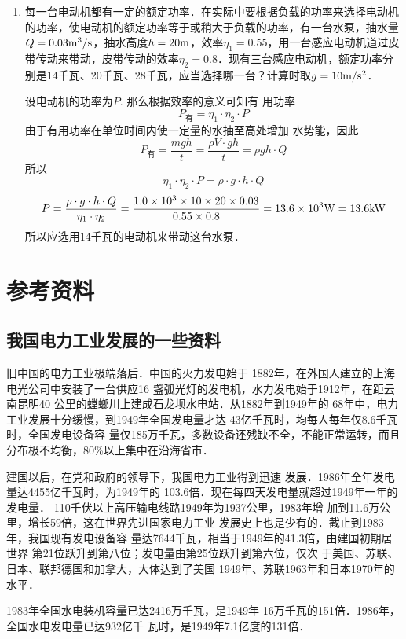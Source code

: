\begin{enumerate}
    \item 每一台电动机都有一定的额定功率．在实际中要根据负载的功率来选择电动机的功率，使电动机的额定功率等于或稍大于负载的功率，有一台水泵，抽水量$Q=0.03{\rm m^3}/{\rm s}$，抽水高度$h=20{\rm m}$，效率$\eta_1=0.55$，用一台感应电动机道过皮带传动来带动，皮带传动的效率$\eta_2=0.8$．现有三台感应电动机，额定功率分别是14千瓦、20千瓦、28千瓦，应当选择哪一台？计算时取$g=10\text{m}/\text{s}^2$．

    \begin{solution}
设电动机的功率为$P$. 那么根据效率的意义可知有
用功率
\[P_{\text{有}}=\eta_1\cdot \eta_2\cdot P\]
由于有用功率在单位时间内使一定量的水抽至高处增加
水势能，因此
\[P_{\text{有}}=\frac{mgh}{t}=\frac{\rho V\cdot gh}{t}=\rho gh\cdot Q\]
所以
\[\eta_1\cdot \eta_2\cdot Ρ=\rho \cdot g\cdot h\cdot Q\]
\[P=\frac{\rho \cdot g\cdot h\cdot Q}{\eta_1\cdot \eta_2}=\frac{1.0\times 10^3\times 10\times 20\times 0.03}{0.55\times 0.8}=13.6\times 10^3{\rm W}=13.6{\rm kW}\]
所以应选用14千瓦的电动机来带动这台水泵．
    \end{solution}    
\end{enumerate}



\section{参考资料}
\subsection{我国电力工业发展的一些资料}

旧中国的电力工业极端落后．中国的火力发电始于
1882年，在外国人建立的上海电光公司中安装了一台供应16
盏弧光灯的发电机，水力发电始于1912年，在距云南昆明40
公里的螳螂川上建成石龙坝水电站．从1882年到1949年的
68年中，电力工业发展十分缓慢，到1949年全国发电量才达
43亿千瓦时，均每人每年仅8.6千瓦时，全国发电设备容
量仅185万千瓦，多数设备还残缺不全，不能正常运转，而且
分布极不均衡，80\%以上集中在沿海省市．

建国以后，在党和政府的领导下，我国电力工业得到迅速
发展．1986年全年发电量达4455亿千瓦时，为1949年的
103.6倍．现在每四天发电量就超过1949年一年的发电量．
110千伏以上高压输电线路1949年为1937公里，1983年增
加到11.6万公里，增长59倍，这在世界先进国家电力工业
发展史上也是少有的．截止到1983年，我国现有发电设备容
量达7644千瓦，相当于1949年的41.3倍，由建国初期居世界
第21位跃升到第八位；发电量由第25位跃升到第六位，仅次
于美国、苏联、日本、联邦德国和加拿大，大体达到了美国
1949年、苏联1963年和日本1970年的水平．

1983年全国水电装机容量已达2416万千瓦，是1949年
16万千瓦的151倍．1986年，全国水电发电量已达932亿千
瓦时，是1949年7.1亿度的131倍．

